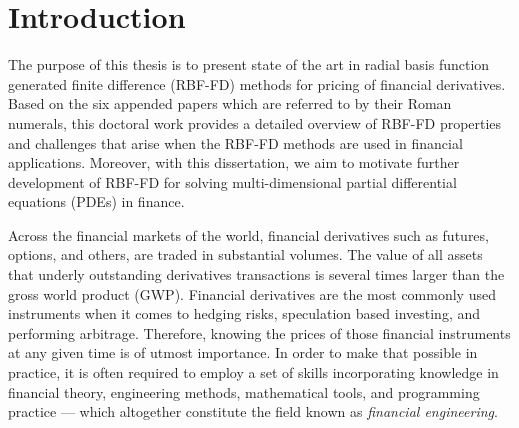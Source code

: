 \documentclass{UUThesisTemplate}
\begin{document}
    \begingroup
        \tableofcontents
    \endgroup

\mainmatter
%    
%    
%    

%    
%
%





%
\chapter{Introduction}
\label{ch:introduction}

\par
The purpose of this thesis is to present state of the art in radial basis function generated finite difference (RBF-FD) methods for pricing of financial derivatives. Based on the six appended papers which are referred to by their Roman numerals, this doctoral work provides a detailed overview of RBF-FD properties and challenges that arise when the RBF-FD methods are used in financial applications. Moreover, with this dissertation, we aim to motivate further development of RBF-FD for solving multi-dimensional partial differential equations (PDEs) in finance.

\par
Across the financial markets of the world, financial derivatives such as futures, options, and others, are traded in substantial volumes. The value of all assets that underly outstanding derivatives transactions is several times larger than the gross world product (GWP). Financial derivatives are the most commonly used instruments when it comes to hedging risks, speculation based investing, and performing arbitrage. Therefore, knowing the prices of those financial instruments at any given time is of utmost importance. In order to make that possible in practice, it is often required to employ a set of skills incorporating knowledge in financial theory, engineering methods, mathematical tools, and programming practice --- which altogether constitute the field known as \emph{financial engineering}. 
\end{document}
